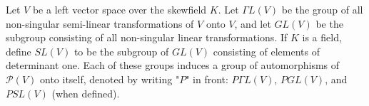 Let $V$ be a left vector space over the skewfield $K$. Let $\Gamma L(V)$ be the group of all non-singular semi-linear transformations of $V$ onto $V$, and let $GL(V)$ be the subgroup consisting of all non-singular linear transformations. If $K$ is a field, define $SL(V)$ to be the subgroup of $GL(V)$ consisting of elements of determinant one. Each of these groups induces a group of automorphisms of $\mathcal{P}(V)$ onto itself, denoted by writing "$P$" in front: $P\Gamma L(V)$, $PGL(V)$, and $PSL(V)$ (when defined).
